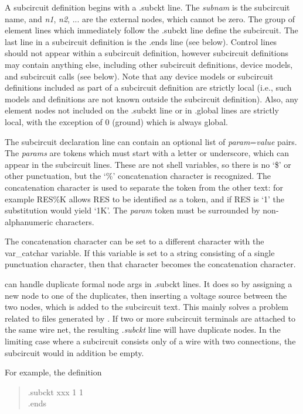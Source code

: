 A subcircuit definition begins with a {\vt .subckt} line.  The
{\it subnam\/} is the subcircuit name, and {\it n1\/}, {\it n2\/},
...  are the external nodes, which cannot be zero.  The group of
element lines which immediately follow the {\vt .subckt} line define
the subcircuit.  The last line in a subcircuit definition is the {\vt
.ends} line (see below).  Control lines should not appear within a
subcircuit definition, however subcircuit definitions may contain
anything else, including other subcircuit definitions, device models,
and subcircuit calls (see below).  Note that any device models or
subcircuit definitions included as part of a subcircuit definition are
strictly local (i.e., such models and definitions are not known
outside the subcircuit definition).  Also, any element nodes not
included on the {\vt .subckt} line or in {\vt .global} lines are
strictly local, with the exception of 0 (ground) which is always
global.

The subcircuit declaration line can contain an optional list of {\it
param\/}={\it value} pairs.  The {\it params} are tokens which must
start with a letter or underscore, which can appear in the subcircuit
lines.  These are not shell variables, so there is no `{\vt \$}' or
other punctuation, but the `{\vt \%}' concatenation character is
recognized.  The concatenation character is used to separate the token
from the other text:  for example {\vt RES\%K} allows {\vt RES} to be
identified as a token, and if {\vt RES} is `1' the substitution would
yield `1K'.  The {\it param} token must be surrounded by
non-alphanumeric characters.

The concatenation character can be set to a different character with
the {\et var\_catchar} variable.  If this variable is set to a string
consisting of a single punctuation character, then that character
becomes the concatenation character.

{\WRspice} can handle duplicate formal node args in {\vt .subckt}
lines.  It does so by assigning a new node to one of the duplicates,
then inserting a voltage source between the two nodes, which is added
to the subcircuit text.  This mainly solves a problem related to files
generated by {\Xic}.  If two or more subcircuit terminals are attached
to the same wire net, the resulting {\it .subckt} line will have
duplicate nodes.  In the limiting case where a subcircuit consists
only of a wire with two connections, the subcircuit would in addition
be empty.

For example, the definition
\begin{quote}
{\vt .subckt xxx 1 1\\
 .ends}
\end{quote}

